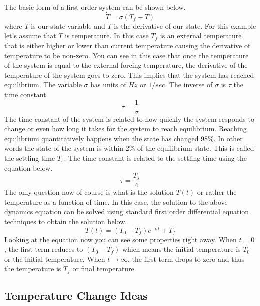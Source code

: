 The basic form of a first order system can be shown below.
\begin{equation}
\dot{T} = \sigma (T_f - T)
\end{equation}
where $T$ is our state variable and $\dot{T}$ is the derivative of our state. For this example let's assume that $T$ is temperature. In this case $T_f$ is an external temperature that is either higher or lower than current temperature causing the derivative of temperature to be non-zero. You can see in this case that once the temperature of the system is equal to the external forcing temperature, the derivative of the temperature of the system goes to zero. This implies that the system has reached equilibrium. The variable $\sigma$ has units of $Hz$ or $1/sec$. The inverse of $\sigma$ is $\tau$ the time constant.
\begin{equation}
\tau = \frac{1}{\sigma}
\end{equation}
The time constant of the system is related to how quickly the system responds to change or even how long it takes for the system to reach equilibrium. Reaching equilibrium quantitatively happens when the state has changed 98\%. In other words the state of the system is within 2\% of the equilibrium state. This is called the settling time $T_s$. The time constant is related to the settling time using the equation below.
\begin{equation}
\tau = \frac{T_s}{4}
\end{equation}
The only question now of course is what is the solution $T(t)$ or rather the temperature as a function of time. In this case, the solution to the above dynamics equation can be solved using \href{https://www.youtube.com/watch?v=VOv2HI3i7oo}{standard first order differential equation techniques} to obtain the solution below.
\begin{equation}\label{e:thermistor}
T(t) = (T_0-T_f)e^{-\sigma t} + T_f
\end{equation}
Looking at the equation now you can see some properties right away. When $t=0$, the first term reduces to $(T_0-T_f)$ which means the initial temperature is $T_0$ or the initial temperature. When $t\rightarrow\infty$, the first term drops to zero and thus the temperature is $T_f$ or final temperature.

\subsection{Temperature Change Ideas}

